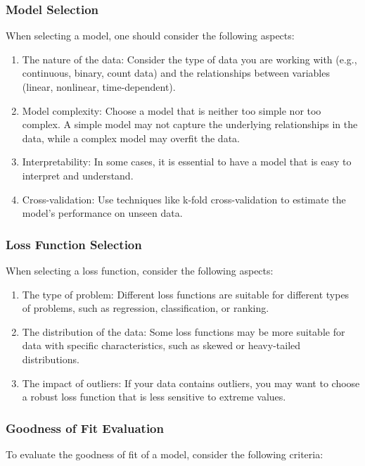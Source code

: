 \documentclass{article}
\begin{document}
\subsubsection{Model Selection}
When selecting a model, one should consider the following aspects:

\begin{enumerate}
\item The nature of the data: Consider the type of data you are working with (e.g., continuous, binary, count data) and the relationships between variables (linear, nonlinear, time-dependent).
\item Model complexity: Choose a model that is neither too simple nor too complex. A simple model may not capture the underlying relationships in the data, while a complex model may overfit the data.
\item Interpretability: In some cases, it is essential to have a model that is easy to interpret and understand.
\item Cross-validation: Use techniques like k-fold cross-validation to estimate the model's performance on unseen data.
\end{enumerate}

\subsubsection{Loss Function Selection}
When selecting a loss function, consider the following aspects:

\begin{enumerate}
\item The type of problem: Different loss functions are suitable for different types of problems, such as regression, classification, or ranking.
\item The distribution of the data: Some loss functions may be more suitable for data with specific characteristics, such as skewed or heavy-tailed distributions.
\item The impact of outliers: If your data contains outliers, you may want to choose a robust loss function that is less sensitive to extreme values.
\end{enumerate}

\subsubsection{Goodness of Fit Evaluation}
To evaluate the goodness of fit of a model, consider the following criteria:
\end{document}
